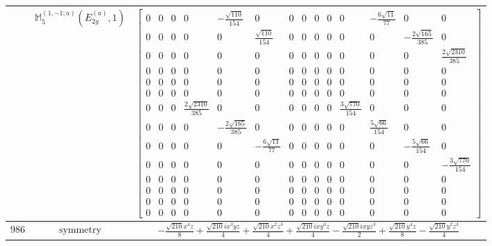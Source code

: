 \documentclass[fleqn,8pt,landscape]{jsarticle}
\begin{document}
\begin{longtable}{ccc}
$  $ & $ \mathbb{M}_{5}^{(1,-1;a)}(E_{2g}^{(a)},1) $ & $ \begin{bmatrix} 0 & 0 & 0 & 0 & - \frac{\sqrt{110}}{154} & 0 & 0 & 0 & 0 & 0 & 0 & - \frac{6 \sqrt{11}}{77} & 0 & 0 \\ 0 & 0 & 0 & 0 & 0 & \frac{\sqrt{110}}{154} & 0 & 0 & 0 & 0 & 0 & 0 & - \frac{2 \sqrt{165}}{385} & 0 \\ 0 & 0 & 0 & 0 & 0 & 0 & 0 & 0 & 0 & 0 & 0 & 0 & 0 & \frac{2 \sqrt{2310}}{385} \\ 0 & 0 & 0 & 0 & 0 & 0 & 0 & 0 & 0 & 0 & 0 & 0 & 0 & 0 \\ 0 & 0 & 0 & 0 & 0 & 0 & 0 & 0 & 0 & 0 & 0 & 0 & 0 & 0 \\ 0 & 0 & 0 & 0 & 0 & 0 & 0 & 0 & 0 & 0 & 0 & 0 & 0 & 0 \\ 0 & 0 & 0 & \frac{2 \sqrt{2310}}{385} & 0 & 0 & 0 & 0 & 0 & 0 & \frac{3 \sqrt{770}}{154} & 0 & 0 & 0 \\ 0 & 0 & 0 & 0 & - \frac{2 \sqrt{165}}{385} & 0 & 0 & 0 & 0 & 0 & 0 & \frac{5 \sqrt{66}}{154} & 0 & 0 \\ 0 & 0 & 0 & 0 & 0 & - \frac{6 \sqrt{11}}{77} & 0 & 0 & 0 & 0 & 0 & 0 & - \frac{5 \sqrt{66}}{154} & 0 \\ 0 & 0 & 0 & 0 & 0 & 0 & 0 & 0 & 0 & 0 & 0 & 0 & 0 & - \frac{3 \sqrt{770}}{154} \\ 0 & 0 & 0 & 0 & 0 & 0 & 0 & 0 & 0 & 0 & 0 & 0 & 0 & 0 \\ 0 & 0 & 0 & 0 & 0 & 0 & 0 & 0 & 0 & 0 & 0 & 0 & 0 & 0 \\ 0 & 0 & 0 & 0 & 0 & 0 & 0 & 0 & 0 & 0 & 0 & 0 & 0 & 0 \\ 0 & 0 & 0 & 0 & 0 & 0 & 0 & 0 & 0 & 0 & 0 & 0 & 0 & 0 \end{bmatrix} $ \\ \hline
$ 986 $ & $ \text{symmetry} $ & $ - \frac{\sqrt{210} x^{4} z}{8} + \frac{\sqrt{210} i x^{3} y z}{4} + \frac{\sqrt{210} x^{2} z^{3}}{4} + \frac{\sqrt{210} i x y^{3} z}{4} - \frac{\sqrt{210} i x y z^{3}}{2} + \frac{\sqrt{210} y^{4} z}{8} - \frac{\sqrt{210} y^{2} z^{3}}{4} $ \\

\end{longtable}
\end{document}
